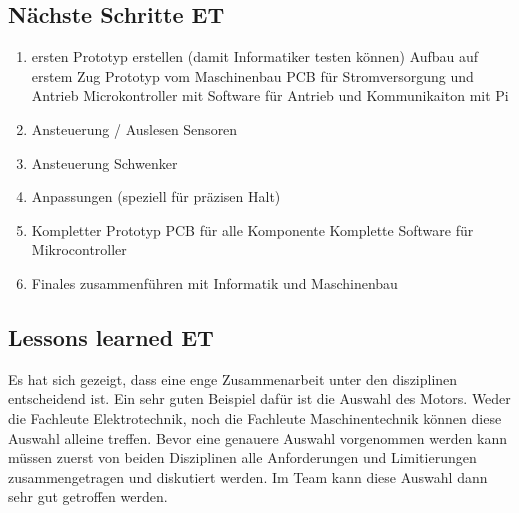 \documentclass[../../main.tex]{subfiles}
\begin{document}
\subsection{Nächste Schritte ET}
\begin{enumerate}
    \item ersten Prototyp erstellen (damit Informatiker testen können)
        \subitem Aufbau auf erstem Zug Prototyp vom Maschinenbau
        \subitem PCB für Stromversorgung und Antrieb
        \subitem Microkontroller mit Software für Antrieb und Kommunikaiton mit Pi 
    \item Ansteuerung / Auslesen Sensoren
    \item Ansteuerung Schwenker
    \item Anpassungen (speziell für präzisen Halt)
    \item Kompletter Prototyp
        \subitem PCB für alle Komponente
        \subitem Komplette Software für Mikrocontroller
    \item Finales zusammenführen mit Informatik und Maschinenbau
\end{enumerate}

\subsection{Lessons learned ET}
Es hat sich gezeigt, dass eine enge Zusammenarbeit unter den disziplinen entscheidend ist. Ein sehr guten Beispiel dafür ist die Auswahl des Motors. Weder die Fachleute Elektrotechnik, noch die Fachleute Maschinentechnik können diese Auswahl alleine treffen. Bevor eine genauere Auswahl vorgenommen werden kann müssen zuerst von beiden Disziplinen alle Anforderungen und Limitierungen zusammengetragen und diskutiert werden. Im Team kann diese Auswahl dann sehr gut getroffen werden.
\end{document}
